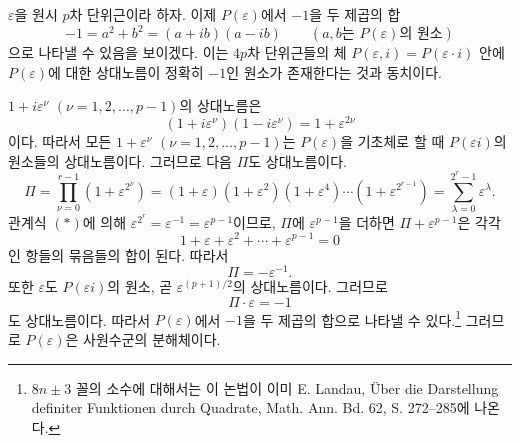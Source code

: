 \documentclass[11pt]{article}
\begin{document}
$\varepsilon$을 원시 $p$차 단위근이라 하자. 이제 $P(\varepsilon)$에서 $-1$을 두 제곱의 합
\[
        -1=a^2+b^2=(a+ib)(a-ib)\qquad (a,b\text{는 }P(\varepsilon)\text{의 원소})
\]
으로 나타낼 수 있음을 보이겠다. 이는 $4p$차 단위근들의 체 $P(\varepsilon,i)=P(\varepsilon\cdot i)$ 안에 $P(\varepsilon)$에 대한 상대노름이 정확히 $-1$인 원소가 존재한다는 것과 동치이다.

$1+i\varepsilon^\nu$ $(\nu=1,2,\ldots,p-1)$의 상대노름은
\[
(1+i\varepsilon^\nu)(1-i\varepsilon^\nu)=1+\varepsilon^{2\nu}
\]
이다. 따라서 모든 $1+\varepsilon^\nu$ $(\nu=1,2,\ldots,p-1)$는 $P(\varepsilon)$을 기초체로 할 때 $P(\varepsilon i)$의 원소들의 상대노름이다. 그러므로 다음 $\Pi$도 상대노름이다.
\[
\Pi=\prod_{\nu=0}^{r-1}(1+\varepsilon^{2^\nu})
=(1+\varepsilon)(1+\varepsilon^2)(1+\varepsilon^4)\cdots(1+\varepsilon^{2^{r-1}})
=\sum_{\lambda=0}^{2^r-1}\varepsilon^\lambda.
\]
관계식 $(*)$에 의해 $\varepsilon^{2^r}=\varepsilon^{-1}=\varepsilon^{p-1}$이므로, $\Pi$에 $\varepsilon^{p-1}$을 더하면 $\Pi+\varepsilon^{p-1}$은 각각
\[
1+\varepsilon+\varepsilon^2+\cdots+\varepsilon^{p-1}=0
\]
인 항들의 묶음들의 합이 된다. 따라서
\[
        \Pi=-\varepsilon^{-1}.
\]
또한 $\varepsilon$도 $P(\varepsilon i)$의 원소, 곧 $\varepsilon^{(p+1)/2}$의 상대노름이다. 그러므로
\[
        \Pi\cdot\varepsilon=-1
\]
도 상대노름이다. 따라서 $P(\varepsilon)$에서 $-1$을 두 제곱의 합으로 나타낼 수 있다.\footnote{$8n\pm3$ 꼴의 소수에 대해서는 이 논법이 이미 E. Landau, Über die Darstellung definiter Funktionen durch Quadrate, Math. Ann. Bd. 62, S. 272--285에 나온다.} 그러므로 $P(\varepsilon)$은 사원수군의 분해체이다.
\end{document}
